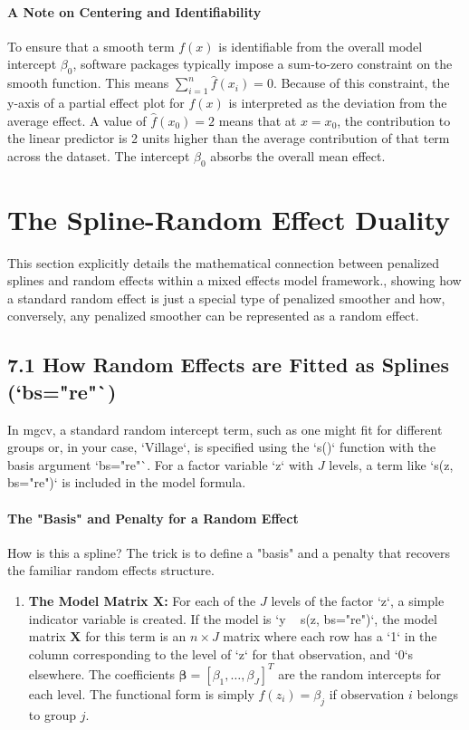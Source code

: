 \documentclass[11pt, a4paper]{article}
\begin{document}
\begin{itemize}
\paragraph{A Note on Centering and Identifiability}
To ensure that a smooth term $f(x)$ is identifiable from the overall model intercept $\beta_0$, software packages typically impose a sum-to-zero constraint on the smooth function. This means $\sum_{i=1}^n \hat{f}(x_i) = 0$.
Because of this constraint, the y-axis of a partial effect plot for $f(x)$ is interpreted as the deviation from the average effect. A value of $\hat{f}(x_0) = 2$ means that at $x=x_0$, the contribution to the linear predictor is 2 units higher than the average contribution of that term across the dataset. The intercept $\beta_0$ absorbs the overall mean effect.


\newpage
\section{The Spline-Random Effect Duality}
 This section explicitly details the mathematical connection between penalized splines and random effects within a mixed effects model framework., showing how a standard random effect is just a special type of penalized smoother and how, conversely, any penalized smoother can be represented as a random effect.

\subsection{7.1 How Random Effects are Fitted as Splines (`bs="re"`)}
In mgcv, a standard random intercept term, such as one might fit for different groups or, in your case, `Village`, is specified using the `s()` function with the basis argument `bs="re"`. For a factor variable `z` with $J$ levels, a term like `s(z, bs="re")` is included in the model formula.

\paragraph{The "Basis" and Penalty for a Random Effect}
How is this a spline? The trick is to define a "basis" and a penalty that recovers the familiar random effects structure.
\begin{enumerate}
    \item \textbf{The Model Matrix $\mathbf{X}$:} For each of the $J$ levels of the factor `z`, a simple indicator variable is created. If the model is `y ~ s(z, bs="re")`, the model matrix $\mathbf{X}$ for this term is an $n \times J$ matrix where each row has a `1` in the column corresponding to the level of `z` for that observation, and `0`s elsewhere. The coefficients $\boldsymbol{\beta} = [\beta_1, \dots, \beta_J]^T$ are the random intercepts for each level. The functional form is simply $f(z_i) = \beta_j$ if observation $i$ belongs to group $j$.


\end{enumerate}
\end{itemize}
\end{document}
